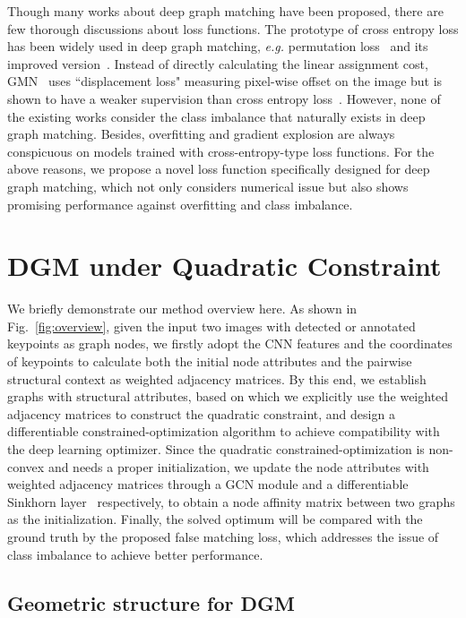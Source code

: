 \documentclass[final]{cvpr}
\begin{document}
 Though many works about deep graph matching have been proposed, there are few thorough discussions about loss functions. The prototype of cross entropy loss has been widely used in deep graph matching, {\em e.g.} permutation loss~\cite{wang2019learning} and its improved version~\cite{yu2020learning}. Instead of directly calculating the linear assignment cost, GMN~\cite{zanfir2018deep} uses ``displacement loss" measuring pixel-wise offset on the image but is shown to have a weaker supervision than cross entropy loss~\cite{wang2019learning}. However, none of the existing works consider the class imbalance that naturally exists in deep graph matching. Besides, overfitting and gradient explosion are always conspicuous on models trained with cross-entropy-type loss functions. For the above reasons, we propose a novel loss function specifically designed for deep graph matching, which not only considers numerical issue but also shows promising performance against overfitting and class imbalance.

\section{DGM under Quadratic Constraint}
We briefly demonstrate our method overview here. As shown in Fig.~\ref{fig:overview}, given the input two images with detected or annotated keypoints as graph nodes, we firstly adopt the CNN features and the coordinates of keypoints to calculate both the initial node attributes and the pairwise structural context as weighted adjacency matrices. By this end, we establish graphs with structural attributes, based on which we explicitly use the weighted adjacency matrices to construct the quadratic constraint, and design a differentiable constrained-optimization algorithm to achieve compatibility with the deep learning optimizer. Since the quadratic constrained-optimization is non-convex and needs a proper initialization, we update the node attributes with weighted adjacency matrices through a GCN module and a differentiable Sinkhorn layer~\cite{adams2011ranking,sinkhorn1967concerning} respectively, to obtain a node affinity matrix between two graphs as the initialization. Finally, the solved optimum will be compared with the ground truth by the proposed false matching loss, which addresses the issue of class imbalance to achieve better performance.

\subsection{Geometric structure for DGM}
\end{document}
